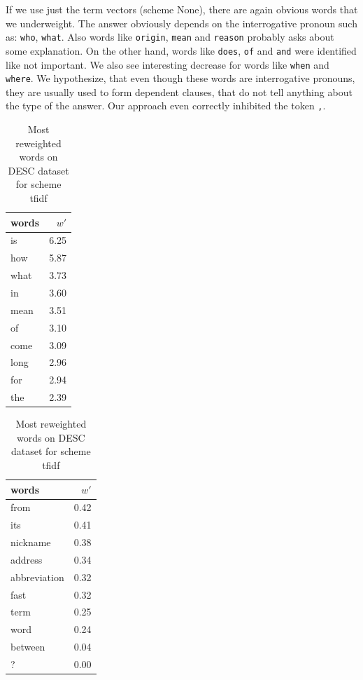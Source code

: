     If we use just the term vectors (scheme None), there are again obvious words that we underweight.
    The answer obviously depends on the interrogative pronoun such as: \texttt{who}, \texttt{what}.
    Also words like \texttt{origin}, \texttt{mean} and \texttt{reason} probably asks about some explanation.
    On the other hand, words like \texttt{does}, \texttt{of} and \texttt{and} were identified like not important.
    We also see interesting decrease for words like \texttt{when} and \texttt{where}.
    We hypothesize, that even though these words are interrogative pronouns, they are usually used to form dependent clauses, that do not tell anything about the type of the answer.
    Our approach even correctly inhibited the token \texttt{,}.
 

\begin{table}[h]
    \centering
    \begin{minipage}{.4\linewidth}
      \centering
        \begin{tabular}{lr}
\toprule
words &  $w'$ \\
\midrule
   is &  6.25 \\
  how &  5.87 \\
 what &  3.73 \\
   in &  3.60 \\
 mean &  3.51 \\
   of &  3.10 \\
 come &  3.09 \\
 long &  2.96 \\
  for &  2.94 \\
  the &  2.39 \\
\bottomrule
\end{tabular}

    \end{minipage}
    \begin{minipage}{.4\linewidth}
      \centering
        \begin{tabular}{lr}
\toprule
        words &  $w'$ \\
\midrule
         from &  0.42 \\
          its &  0.41 \\
     nickname &  0.38 \\
      address &  0.34 \\
 abbreviation &  0.32 \\
         fast &  0.32 \\
         term &  0.25 \\
         word &  0.24 \\
      between &  0.04 \\
            ? &  0.00 \\
\bottomrule
\end{tabular}

    \end{minipage} 
    \caption{Most reweighted words on DESC dataset for scheme tfidf}
    \label{tab:words:trec:tfidf}
\end{table}


